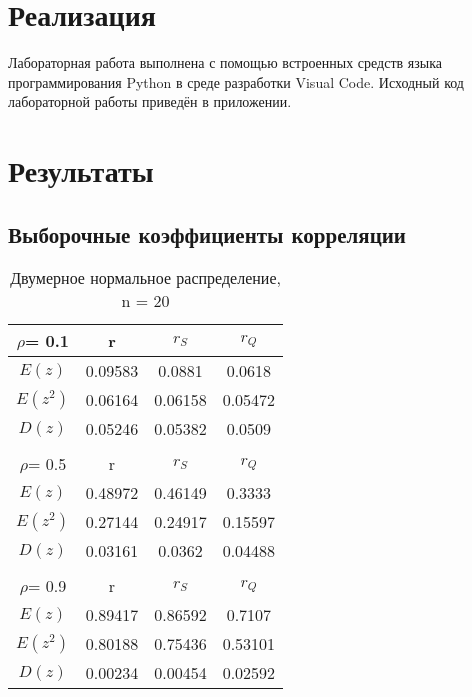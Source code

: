 \documentclass[12pt,a4paper]{scrartcl}
\begin{document}
\section {Реализация}
Лабораторная работа выполнена с помощью встроенных средств языка программирования Python в среде разработки Visual Code. Исходный код лабораторной работы приведён в приложении.
 
\section{Результаты}

\subsection{Выборочные коэффициенты корреляции}

\begin{table}[H]
    \centering
    \begin{tabular}{| c | c | c | c |}
\hline
 $\rho$= 0.1 & r       & $r_S$   & $r_Q$   \\ \hline
 $E(z)$      & 0.09583 & 0.0881  & 0.0618  \\ \hline
 $E(z^2)$    & 0.06164 & 0.06158 & 0.05472 \\ \hline
 $D(z)$      & 0.05246 & 0.05382 & 0.0509  \\ \hline
&  & & \\  \hline
 $\rho$= 0.5 & r       & $r_S$   & $r_Q$   \\ \hline
 $E(z)$      & 0.48972 & 0.46149 & 0.3333  \\ \hline
 $E(z^2)$    & 0.27144 & 0.24917 & 0.15597 \\ \hline
 $D(z)$      & 0.03161 & 0.0362  & 0.04488 \\ \hline
&  & & \\  \hline
 $\rho$= 0.9 & r       & $r_S$   & $r_Q$   \\ \hline
 $E(z)$      & 0.89417 & 0.86592 & 0.7107  \\ \hline
 $E(z^2)$    & 0.80188 & 0.75436 & 0.53101 \\ \hline
 $D(z)$      & 0.00234 & 0.00454 & 0.02592 \\
\hline
\end{tabular}
 \caption{Двумерное нормальное распределение, n = 20}
\label{tab:norm_20}
\end{table}
\end{document}
